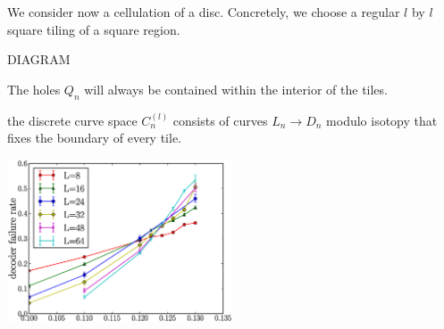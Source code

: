 \documentclass[12pt,a4paper]{article}
\begin{document}


We consider now a cellulation of a disc.
Concretely, we choose a regular $l$ by $l$ square tiling of a square region.

DIAGRAM

The holes $Q_n$ will always be contained within the interior of the
tiles.

 the discrete curve space $C_n^(l)$ consists of
curves $L_n\to D_n$ modulo isotopy that fixes the boundary of
every tile.







\begin{center}
\includegraphics[width=0.5\textwidth]{threshold-graph.eps}
\end{center}


%
\end{document}
